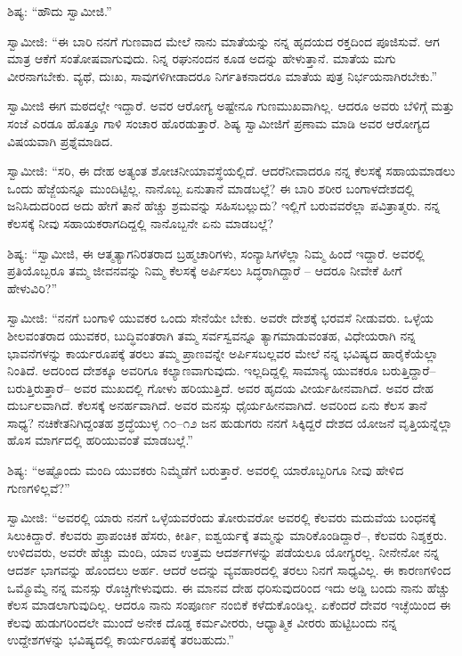  ಶಿಷ್ಯ: “ಹೌದು ಸ್ವಾಮೀಜಿ.” 

\newpage

 ಸ್ವಾಮೀಜಿ: “ಈ ಬಾರಿ ನನಗೆ ಗುಣವಾದ ಮೇಲೆ ನಾನು ಮಾತೆಯನ್ನು ನನ್ನ ಹೃದಯದ ರಕ್ತದಿಂದ ಪೂಜಿಸುವೆ. ಆಗ ಮಾತ್ರ ಆಕೆಗೆ ಸಂತೋಷವಾಗುವುದು. ನಿನ್ನ ರಘುನಂದನ ಕೂಡ ಅದನ್ನು ಹೇಳುತ್ತಾನೆ. ಮಾತೆಯ ಮಗು ವೀರನಾಗಬೇಕು. ವ್ಯಥೆ, ದುಃಖ, ಸಾವುಗಳಿಗೀಡಾದರೂ ನಿರ್ಗತಿಕನಾದರೂ ಮಾತೆಯ ಪುತ್ರ ನಿರ್ಭಯನಾಗಿರಬೇಕು.” 

 ಸ್ವಾಮೀಜಿ ಈಗ ಮಠದಲ್ಲೇ ಇದ್ದಾರೆ. ಅವರ ಆರೋಗ್ಯ ಅಷ್ಟೇನೂ ಗುಣಮುಖವಾಗಿಲ್ಲ. ಆದರೂ ಅವರು ಬೆಳಿಗ್ಗೆ ಮತ್ತು ಸಂಜೆ ಎರಡೂ ಹೊತ್ತೂ ಗಾಳಿ ಸಂಚಾರ ಹೊರಡುತ್ತಾರೆ. ಶಿಷ್ಯ ಸ್ವಾಮೀಜಿಗೆ ಪ್ರಣಾಮ ಮಾಡಿ ಅವರ ಆರೋಗ್ಯದ ವಿಷಯವಾಗಿ ಪ್ರಶ್ನೆಮಾಡಿದ. 

 ಸ್ವಾಮೀಜಿ: “ಸರಿ, ಈ ದೇಹ ಅತ್ಯಂತ ಶೋಚನೀಯಾವಸ್ಥೆಯಲ್ಲಿದೆ. ಆದರೆ\break ನೀವಾದರೂ ನನ್ನ ಕೆಲಸಕ್ಕೆ ಸಹಾಯಮಾಡಲು ಒಂದು ಹೆಜ್ಜೆಯನ್ನೂ ಮುಂದಿಟ್ಟಿಲ್ಲ. ನಾನೊಬ್ಬ ಏನುತಾನೆ ಮಾಡಬಲ್ಲೆ? ಈ ಬಾರಿ ಶರೀರ ಬಂಗಾಳದೇಶದಲ್ಲಿ ಜನಿಸಿದುದರಿಂದ ಅದು ಹೇಗೆ ತಾನೆ ಹೆಚ್ಚು ಶ್ರಮವನ್ನು ಸಹಿಸಬಲ್ಲುದು? ಇಲ್ಲಿಗೆ ಬರುವವರೆಲ್ಲಾ ಪವಿತ್ರಾತ್ಮರು. ನನ್ನ ಕೆಲಸಕ್ಕೆ ನೀವು ಸಹಾಯಕರಾಗದಿದ್ದಲ್ಲಿ ನಾನೊಬ್ಬನೇ ಏನು ಮಾಡಬಲ್ಲೆ? 

 ಶಿಷ್ಯ: “ಸ್ವಾಮೀಜಿ, ಈ ಆತ್ಮತ್ಯಾಗನಿರತರಾದ ಬ್ರಹ್ಮಚಾರಿಗಳು, ಸಂನ್ಯಾಸಿಗಳೆಲ್ಲಾ ನಿಮ್ಮ ಹಿಂದೆ ಇದ್ದಾರೆ. ಅವರಲ್ಲಿ ಪ್ರತಿಯೊಬ್ಬರೂ ತಮ್ಮ ಜೀವನವನ್ನು ನಿಮ್ಮ ಕೆಲಸಕ್ಕೆ ಅರ್ಪಿಸಲು ಸಿದ್ಧರಾಗಿದ್ದಾರೆ – ಆದರೂ ನೀವೇಕೆ ಹೀಗೆ ಹೇಳುವಿರಿ?” 

 ಸ್ವಾಮೀಜಿ: “ನನಗೆ ಬಂಗಾಳಿ ಯುವಕರ ಒಂದು ಸೇನೆಯೇ ಬೇಕು. ಅವರೇ ದೇಶಕ್ಕೆ ಭರವಸೆ ನೀಡುವರು. ಒಳ್ಳೆಯ ಶೀಲವಂತರಾದ ಯುವಕರ, ಬುದ್ಧಿವಂತರಾಗಿ ತಮ್ಮ ಸರ್ವಸ್ವವನ್ನೂ ತ್ಯಾಗಮಾಡುವಂತಹ, ವಿಧೇಯರಾಗಿ ನನ್ನ ಭಾವನೆಗಳನ್ನು ಕಾರ್ಯರೂಪಕ್ಕೆ ತರಲು ತಮ್ಮ ಪ್ರಾಣವನ್ನೇ ಅರ್ಪಿಸಬಲ್ಲವರ ಮೇಲೆ ನನ್ನ ಭವಿಷ್ಯದ ಹಾರೈಕೆಯೆಲ್ಲಾ ನಿಂತಿದೆ. ಅದರಿಂದ ದೇಶಕ್ಕೂ ಅವರಿಗೂ ಕಲ್ಯಾಣವಾಗುವುದು. ಇಲ್ಲದಿದ್ದಲ್ಲಿ ಸಾಮಾನ್ಯ ಯುವಕರೂ ಬರುತ್ತಿದ್ದಾರೆ– ಬರುತ್ತಿರುತ್ತಾರೆ– ಅವರ ಮುಖದಲ್ಲಿ ಗೋಳು ಹರಿಯುತ್ತಿದೆ. ಅವರ ಹೃದಯ ವೀರ್ಯಹೀನವಾಗಿದೆ. ಅವರ ದೇಹ ದುರ್ಬಲವಾಗಿದೆ. ಕೆಲಸಕ್ಕೆ ಅನರ್ಹವಾಗಿದೆ. ಅವರ ಮನಸ್ಸು ಧೈರ್ಯಹೀನವಾಗಿದೆ. ಅವರಿಂದ ಏನು ಕೆಲಸ ತಾನೆ ಸಾಧ್ಯ? ನಚಿಕೇತನಿಗಿದ್ದಂತಹ ಶ್ರದ್ಧೆಯುಳ್ಳ ೧೦–೧೨ ಜನ ಹುಡುಗರು ನನಗೆ ಸಿಕ್ಕಿದ್ದರೆ ದೇಶದ ಯೋಜನೆ ವೃತ್ತಿಯನ್ನೆಲ್ಲಾ ಹೊಸ ಮಾರ್ಗದಲ್ಲಿ ಹರಿಯುವಂತೆ ಮಾಡಬಲ್ಲೆ.” 

 ಶಿಷ್ಯ: “ಅಷ್ಟೊಂದು ಮಂದಿ ಯುವಕರು ನಿಮ್ಮೆಡೆಗೆ ಬರುತ್ತಾರೆ. ಅವರಲ್ಲಿ ಯಾರೊಬ್ಬರಿಗೂ ನೀವು ಹೇಳಿದ ಗುಣಗಳಿಲ್ಲವೆ?” 

\newpage

 ಸ್ವಾಮೀಜಿ: “ಅವರಲ್ಲಿ ಯಾರು ನನಗೆ ಒಳ್ಳೆಯವರೆಂದು ತೋರುವರೋ ಅವರಲ್ಲಿ ಕೆಲವರು ಮದುವೆಯ ಬಂಧನಕ್ಕೆ ಸಿಲುಕಿದ್ದಾರೆ. ಕೆಲವರು ಪ್ರಾಪಂಚಿಕ ಹೆಸರು, ಕೀರ್ತಿ, ಐಶ್ವರ್ಯಕ್ಕೆ ತಮ್ಮನ್ನು ಮಾರಿಕೊಂಡಿದ್ದಾರೆ–, ಕೆಲವರು ನಿಶ್ಶಕ್ತರು. ಉಳಿದವರು, ಅವರೇ ಹೆಚ್ಚು ಮಂದಿ, ಯಾವ ಉತ್ತಮ ಆದರ್ಶಗಳನ್ನು ಪಡೆಯಲೂ ಯೋಗ್ಯರಲ್ಲ. ನೀನೇನೋ ನನ್ನ ಆದರ್ಶ ಭಾಗವನ್ನು ಹೊಂದಲು ಅರ್ಹ. ಆದರೆ ಅದನ್ನು ವ್ಯವಹಾರದಲ್ಲಿ ತರಲು ನಿನಗೆ ಸಾಧ್ಯವಿಲ್ಲ. ಈ ಕಾರಣಗಳಿಂದ ಒಮ್ಮೊಮ್ಮೆ ನನ್ನ ಮನಸ್ಸು ರೊಚ್ಚಿಗೇಳುವುದು. ಈ ಮಾನವ ದೇಹ ಧರಿಸುವುದರಿಂದ ಇದು ಅಡ್ಡಿ ಬಂದು ನಾನು ಹೆಚ್ಚು ಕೆಲಸ ಮಾಡಲಾಗುವುದಿಲ್ಲ. ಆದರೂ ನಾನು ಸಂಪೂರ್ಣ ನಂಬಿಕೆ ಕಳೆದುಕೊಂಡಿಲ್ಲ. ಏಕೆಂದರೆ ದೇವರ ಇಚ್ಛೆಯಿಂದ ಈ ಕೆಲವು ಹುಡುಗರಿಂದಲೇ ಮುಂದೆ ಅನೇಕ ದೊಡ್ಡ ಕರ್ಮವೀರರು, ಆಧ್ಯಾತ್ಮಿಕ ವೀರರು ಹುಟ್ಟಿಬಂದು ನನ್ನ ಉದ್ದೇಶಗಳನ್ನು ಭವಿಷ್ಯದಲ್ಲಿ ಕಾರ್ಯರೂಪಕ್ಕೆ ತರಬಹುದು.” 


